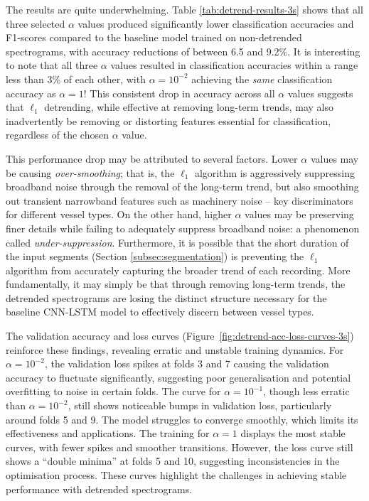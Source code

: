 The results are quite underwhelming. Table \ref{tab:detrend-results-3s} shows that all three selected $\alpha$ values produced significantly lower classification accuracies and F1-scores compared to the baseline model trained on non-detrended spectrograms, with accuracy reductions of between 6.5 and 9.2\%. It is interesting to note that all three $\alpha$ values resulted in classification accuracies within a range less than 3\% of each other, with $\alpha = 10^{-2}$ achieving the \textit{same} classification accuracy as $\alpha = 1$! This consistent drop in accuracy across all $\alpha$ values suggests that $\ell_1$ detrending, while effective at removing long-term trends, may also inadvertently be removing  or distorting features essential for classification, regardless of the chosen $\alpha$ value.

This performance drop may be attributed to several factors. Lower $\alpha$ values may be causing \textit{over-smoothing}; that is, the $\ell_1$ algorithm is aggressively suppressing broadband noise through the removal of the long-term trend, but also smoothing out transient narrowband features such as machinery noise -- key discriminators for different vessel types. On the other hand, higher $\alpha$ values may be preserving finer details while failing to adequately suppress broadband noise: a phenomenon called \textit{under-suppression}. Furthermore, it is possible that the short duration of the input segments (Section \ref{subsec:segmentation}) is preventing the $\ell_1$ algorithm from accurately capturing the broader trend of each recording. More fundamentally, it may simply be that through removing long-term trends, the detrended spectrograms are losing the distinct structure necessary for the baseline CNN-LSTM model to effectively discern between vessel types. 

The validation accuracy and loss curves (Figure~\ref{fig:detrend-acc-loss-curves-3s}) reinforce these findings, revealing erratic and unstable training dynamics. For $\alpha = 10^{-2}$, the validation loss spikes at folds 3 and 7 causing the validation accuracy to fluctuate significantly, suggesting poor generalisation and potential overfitting to noise in certain folds. The curve for $\alpha = 10^{-1}$, though less erratic than $\alpha = 10^{-2}$, still shows noticeable bumps in validation loss, particularly around folds 5 and 9. The model struggles to converge smoothly, which limits its effectiveness and applications. The training for $\alpha = 1$ displays the most stable curves, with fewer spikes and smoother transitions. However, the loss curve still shows a ``double minima'' at folds 5 and 10, suggesting inconsistencies in the optimisation process. These curves highlight the challenges in achieving stable performance with detrended spectrograms.

